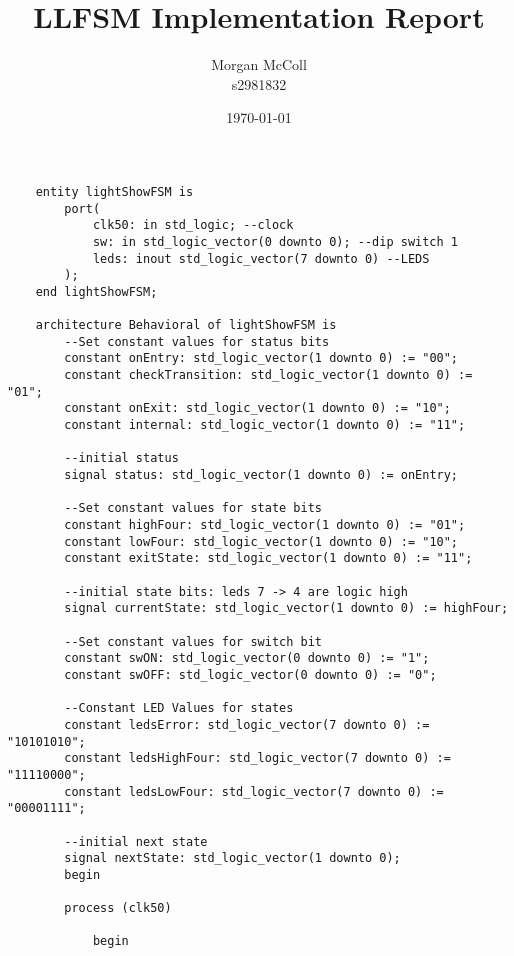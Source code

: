 \documentclass{article}
\begin{document}
	\title{LLFSM Implementation Report}
	\author{Morgan McColl \\s2981832}
	\date{\today}
	\maketitle
	
	\begin{lstlisting}
	entity lightShowFSM is
		port(
			clk50: in std_logic; --clock
			sw: in std_logic_vector(0 downto 0); --dip switch 1
			leds: inout std_logic_vector(7 downto 0) --LEDS
		);
	end lightShowFSM;
	
	architecture Behavioral of lightShowFSM is
		--Set constant values for status bits
		constant onEntry: std_logic_vector(1 downto 0) := "00";
		constant checkTransition: std_logic_vector(1 downto 0) := "01";
		constant onExit: std_logic_vector(1 downto 0) := "10";
		constant internal: std_logic_vector(1 downto 0) := "11";
	
		--initial status
		signal status: std_logic_vector(1 downto 0) := onEntry;
		
		--Set constant values for state bits
		constant highFour: std_logic_vector(1 downto 0) := "01";
		constant lowFour: std_logic_vector(1 downto 0) := "10";
		constant exitState: std_logic_vector(1 downto 0) := "11";
		
		--initial state bits: leds 7 -> 4 are logic high
		signal currentState: std_logic_vector(1 downto 0) := highFour;
		
		--Set constant values for switch bit
		constant swON: std_logic_vector(0 downto 0) := "1";
		constant swOFF: std_logic_vector(0 downto 0) := "0";
		
		--Constant LED Values for states
		constant ledsError: std_logic_vector(7 downto 0) := "10101010";
		constant ledsHighFour: std_logic_vector(7 downto 0) := "11110000";
		constant ledsLowFour: std_logic_vector(7 downto 0) := "00001111";
		
		--initial next state
		signal nextState: std_logic_vector(1 downto 0);
		begin
		
		process (clk50)
		
			begin
			

\end{lstlisting}
\end{document}
